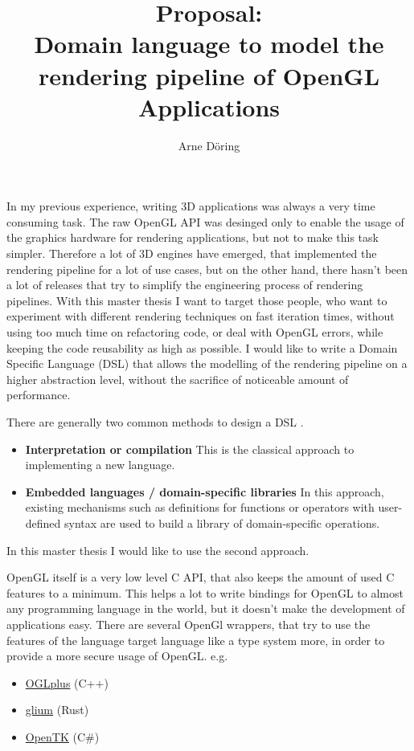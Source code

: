\documentclass[10pt]{report}
\title{Proposal:\\Domain language to model the rendering pipeline of OpenGL Applications}
\author{Arne D\"oring}
\begin{document}
\maketitle

In my previous experience, writing 3D applications was always a very time consuming task. The raw OpenGL API was desinged only to enable the usage of the graphics hardware for rendering applications, but not to make this task simpler. Therefore a lot of 3D engines have emerged, that implemented the rendering pipeline for a lot of use cases, but on the other hand, there hasn't been a lot of releases that try to simplify the engineering process of rendering pipelines. With this master thesis I want to target those people, who want to experiment with different rendering techniques on fast iteration times, without using too much time on refactoring code, or deal with OpenGL errors, while keeping the code reusability as high as possible. I would like to write a Domain Specific Language (DSL) that allows the modelling of the rendering pipeline on a higher abstraction level, without the sacrifice of noticeable amount of performance.

There are generally two common methods to design a DSL \cite{van2000domain}.
\begin{itemize}
\item \textbf{Interpretation or compilation} This is the classical approach to implementing a new language.

\item \textbf{Embedded languages / domain-specific libraries} In this approach, existing mechanisms such as definitions for functions or operators with user-defined syntax are used to build a library of domain-specific operations.
\end{itemize}
In this master thesis I would like to use the second approach.

OpenGL itself is a very low level C API, that also keeps the amount of used C features to a minimum. This helps a lot to write bindings for OpenGL to almost any programming language in the world, but it doesn't make the development of applications easy. There are several OpenGl wrappers, that try to use the features of the language target language like a type system more, in order to provide a more secure usage of OpenGL. e.g.

\begin{itemize}
\item \href{http://oglplus.org/}{OGLplus} (C++)
\item \href{https://github.com/tomaka/glium}{glium} (Rust)
\item \href{http://www.opentk.com/}{OpenTK} (C\#)
\end{itemize}
\end{document}
